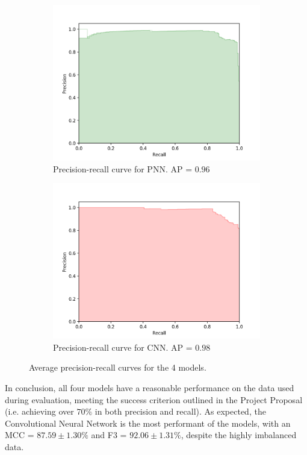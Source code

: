 \begin{figure}[H]
			\begin{subfigure}{.4\textwidth}
				\includegraphics[width=\textwidth]{graphics/precision-recall/pnn}
				\caption{Precision-recall curve for PNN. AP = $0.96$}
				\label{Fig: eval/ml/results/precision-recall/pnn}
			\end{subfigure} \hfill
			\begin{subfigure}{.4\textwidth}
				\includegraphics[width=\textwidth]{graphics/precision-recall/cnn}
				\caption{Precision-recall curve for CNN. AP = $0.98$}
				\label{Fig: eval/ml/results/precision-recall/cnn}
			\end{subfigure}
			\caption{Average precision-recall curves for the 4 models.}
			\label{Fig: eval/ml/results/precision-recall}
		\end{figure}
			In conclusion, all four models have a reasonable performance on the data used during evaluation, meeting the success criterion outlined in the Project Proposal (i.e. achieving over $70\%$ in both precision and recall). As expected, the Convolutional Neural Network is the most performant of the models, with an MCC = $87.59 \pm 1.30 \%$ and F3 = $92.06 \pm 1.31 \%$, despite the highly imbalanced data.
			
